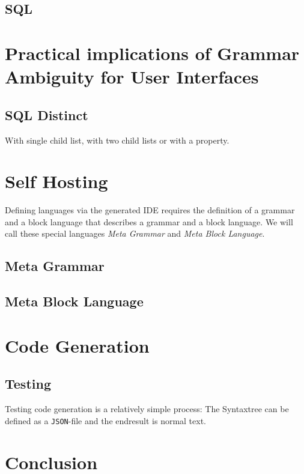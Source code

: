 \subsection{SQL}

\section{Practical implications of Grammar Ambiguity for User Interfaces}

\subsection{SQL Distinct}

With single child list, with two child lists or with a property.

\section{Self Hosting}

Defining languages via the generated IDE requires the definition of a grammar and a block language that describes a grammar and a block language. We will call these special languages \textit{Meta Grammar} and \textit{Meta Block Language}.

\subsection{Meta Grammar}

\subsection{Meta Block Language}

\section{Code Generation}
\label{sec:code-generation-detail}

\subsection{Testing}

Testing code generation is a relatively simple process: The Syntaxtree can be defined as a \texttt{JSON}-file and the endresult is normal text.

\section{Conclusion}


